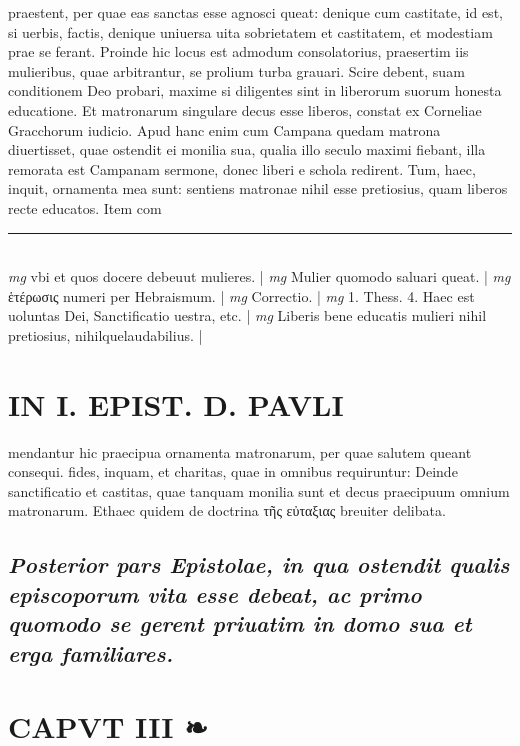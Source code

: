 \documentclass{article}
\begin{document}
\begin{pages}
praestent, per quae eas sanctas esse agnosci queat: denique  cum castitate, id est, si uerbis, factis, denique  uniuersa uita sobrietatem et castitatem, et modestiam prae se ferant. Proinde hic locus est admodum consolatorius, praesertim iis mulieribus, quae arbitrantur, se prolium turba grauari. Scire debent, suam conditionem Deo probari, maxime si diligentes sint in liberorum suorum honesta educatione. Et matronarum singulare decus esse liberos, constat ex Corneliae Gracchorum iudicio. Apud hanc enim cum Campana quedam matrona diuertisset, quae ostendit ei monilia sua, qualia illo seculo maximi fiebant, illa remorata est Campanam sermone, donec liberi e schola redirent. Tum, haec, inquit, ornamenta mea sunt: sentiens matronae nihil esse pretiosius, quam liberos recte educatos. Item com  \pend
\vspace{0.5cm}\noindent
\vspace{0.2cm}\rule{1cm}{0.2pt}\\ 
\hspace{0.2cm}\textit{mg}
\footnotesize vbi  et quos docere debeuut mulieres. 
\normalsize| 
\hspace{0.2cm}\textit{mg}
\footnotesize Mulier quomodo saluari queat. 
\normalsize| 
\hspace{0.2cm}\textit{mg}
\footnotesize ἑτέρωσις numeri per Hebraismum. 
\normalsize| 
\hspace{0.2cm}\textit{mg}
\footnotesize Correctio. 
\normalsize| 
\hspace{0.2cm}\textit{mg}
\footnotesize 1. Thess. 4. Haec est uoluntas Dei, Sanctificatio uestra, etc. 
\normalsize| 
\hspace{0.2cm}\textit{mg}
\footnotesize Liberis bene educatis mulieri nihil pretiosius, nihilquelaudabilius. 
\normalsize| 
\section*{IN I. EPIST. D. PAVLI }
\marginpar{[ p.74 ]}\pstart mendantur hic praecipua ornamenta matronarum, per quae salutem queant consequi. fides, inquam, et charitas, quae in omnibus requiruntur: Deinde sanctificatio et castitas, quae tanquam monilia sunt et decus praecipuum omnium matronarum. Ethaec quidem de doctrina τῆς εὐταξιας  breuiter delibata.  \pend
{}
{}
\subsection*{\textit{Posterior pars Epistolae, in qua ostendit qualis episcoporum vita esse debeat, ac primo quomodo se gerent priuatim in domo sua et erga familiares. }}
\endnumbering\beginnumbering\section{CAPVT III ❧}
{}

\end{pages}
\end{document}
